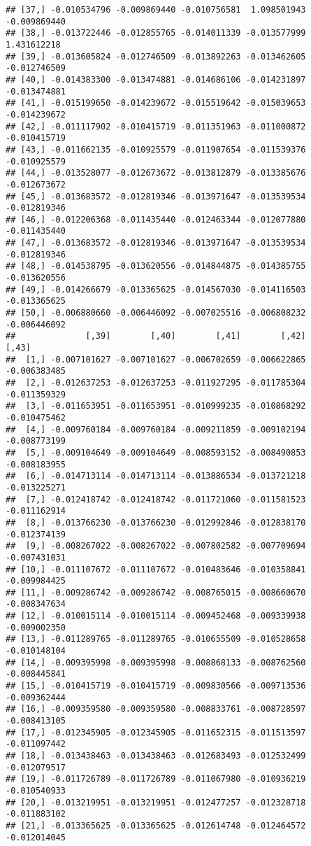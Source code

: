 \documentclass[
]{article}
\begin{document}
\begin{verbatim}
## [37,] -0.010534796 -0.009869440 -0.010756581  1.098501943 -0.009869440
## [38,] -0.013722446 -0.012855765 -0.014011339 -0.013577999  1.431612218
## [39,] -0.013605824 -0.012746509 -0.013892263 -0.013462605 -0.012746509
## [40,] -0.014383300 -0.013474881 -0.014686106 -0.014231897 -0.013474881
## [41,] -0.015199650 -0.014239672 -0.015519642 -0.015039653 -0.014239672
## [42,] -0.011117902 -0.010415719 -0.011351963 -0.011000872 -0.010415719
## [43,] -0.011662135 -0.010925579 -0.011907654 -0.011539376 -0.010925579
## [44,] -0.013528077 -0.012673672 -0.013812879 -0.013385676 -0.012673672
## [45,] -0.013683572 -0.012819346 -0.013971647 -0.013539534 -0.012819346
## [46,] -0.012206368 -0.011435440 -0.012463344 -0.012077880 -0.011435440
## [47,] -0.013683572 -0.012819346 -0.013971647 -0.013539534 -0.012819346
## [48,] -0.014538795 -0.013620556 -0.014844875 -0.014385755 -0.013620556
## [49,] -0.014266679 -0.013365625 -0.014567030 -0.014116503 -0.013365625
## [50,] -0.006880660 -0.006446092 -0.007025516 -0.006808232 -0.006446092
##              [,39]        [,40]        [,41]        [,42]        [,43]
##  [1,] -0.007101627 -0.007101627 -0.006702659 -0.006622865 -0.006383485
##  [2,] -0.012637253 -0.012637253 -0.011927295 -0.011785304 -0.011359329
##  [3,] -0.011653951 -0.011653951 -0.010999235 -0.010868292 -0.010475462
##  [4,] -0.009760184 -0.009760184 -0.009211859 -0.009102194 -0.008773199
##  [5,] -0.009104649 -0.009104649 -0.008593152 -0.008490853 -0.008183955
##  [6,] -0.014713114 -0.014713114 -0.013886534 -0.013721218 -0.013225271
##  [7,] -0.012418742 -0.012418742 -0.011721060 -0.011581523 -0.011162914
##  [8,] -0.013766230 -0.013766230 -0.012992846 -0.012838170 -0.012374139
##  [9,] -0.008267022 -0.008267022 -0.007802582 -0.007709694 -0.007431031
## [10,] -0.011107672 -0.011107672 -0.010483646 -0.010358841 -0.009984425
## [11,] -0.009286742 -0.009286742 -0.008765015 -0.008660670 -0.008347634
## [12,] -0.010015114 -0.010015114 -0.009452468 -0.009339938 -0.009002350
## [13,] -0.011289765 -0.011289765 -0.010655509 -0.010528658 -0.010148104
## [14,] -0.009395998 -0.009395998 -0.008868133 -0.008762560 -0.008445841
## [15,] -0.010415719 -0.010415719 -0.009830566 -0.009713536 -0.009362444
## [16,] -0.009359580 -0.009359580 -0.008833761 -0.008728597 -0.008413105
## [17,] -0.012345905 -0.012345905 -0.011652315 -0.011513597 -0.011097442
## [18,] -0.013438463 -0.013438463 -0.012683493 -0.012532499 -0.012079517
## [19,] -0.011726789 -0.011726789 -0.011067980 -0.010936219 -0.010540933
## [20,] -0.013219951 -0.013219951 -0.012477257 -0.012328718 -0.011883102
## [21,] -0.013365625 -0.013365625 -0.012614748 -0.012464572 -0.012014045

\end{verbatim}
\end{document}
